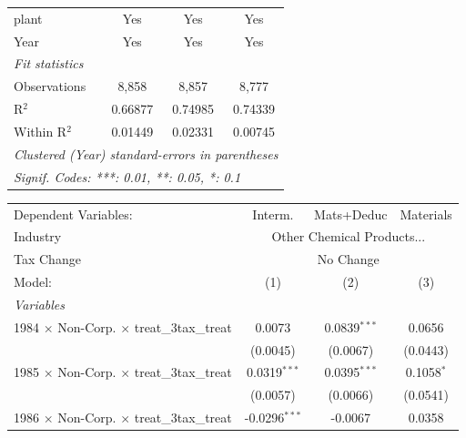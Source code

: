\documentclass[
  12pt]{article}
\theoremstyle{definition}
\theoremstyle{remark}
\begin{document}
\begin{table}
\begin{minipage}{\linewidth}
\begin{tabular}{lccc}
   plant                                                   & Yes            & Yes            & Yes\\  
   Year                                                    & Yes            & Yes            & Yes\\  
   \midrule
   \emph{Fit statistics}\\
   Observations                                            & 8,858          & 8,857          & 8,777\\  
   R$^2$                                                   & 0.66877        & 0.74985        & 0.74339\\  
   Within R$^2$                                            & 0.01449        & 0.02331        & 0.00745\\  
   \midrule \midrule
   \multicolumn{4}{l}{\emph{Clustered (Year) standard-errors in parentheses}}\\
   \multicolumn{4}{l}{\emph{Signif. Codes: ***: 0.01, **: 0.05, *: 0.1}}\\
\end{tabular}
\par\endgroup
\begingroup
\centering
\begin{tabular}{lccc}
   \tabularnewline \midrule \midrule
   Dependent Variables:                                    & Interm.         & Mats+Deduc     & Materials\\  
   Industry & \multicolumn{3}{c}{Other Chemical Products...} \\ 
   Tax Change & \multicolumn{3}{c}{No Change} \\ 
   Model:                                                  & (1)             & (2)            & (3)\\  
   \midrule
   \emph{Variables}\\
   1984 $\times$ Non-Corp. $\times$ treat\_3tax\_treat     & 0.0073          & 0.0839$^{***}$ & 0.0656\\   
                                                           & (0.0045)        & (0.0067)       & (0.0443)\\   
   1985 $\times$ Non-Corp. $\times$ treat\_3tax\_treat     & 0.0319$^{***}$  & 0.0395$^{***}$ & 0.1058$^{*}$\\   
                                                           & (0.0057)        & (0.0066)       & (0.0541)\\   
   1986 $\times$ Non-Corp. $\times$ treat\_3tax\_treat     & -0.0296$^{***}$ & -0.0067        & 0.0358\\   

\end{tabular}
\end{minipage}
\end{table}
\end{document}
